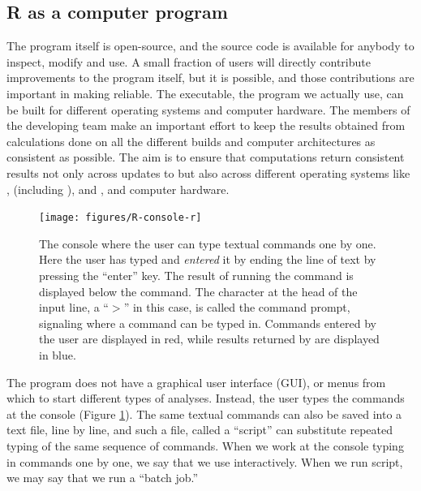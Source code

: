 \documentclass[krantz2]{krantz}\usepackage{knitr}
\begin{document}
\subsection{R as a computer program}
The \Rpgrm program itself is open-source, and the source code is available for anybody to inspect, modify and use. A small fraction of users will directly contribute improvements to the \Rpgrm program itself, but it is possible, and those contributions are important in making \Rpgrm reliable. The executable, the \Rpgrm program we actually use, can be built for different operating systems and computer hardware. The members of the \Rpgrm developing team make an important effort to keep the results obtained from calculations done on all the different builds and computer architectures as consistent as possible. The aim is to ensure that computations return consistent results not only across updates to \Rpgrm but also across different operating systems like ,  (including ), and , and computer hardware.

\begin{figure}
  \centering
  \texttt{[image: figures/R-console-r]}
  \caption[The R console]{The \Rpgrm console where the user can type textual commands one by one. Here the user has typed  and \textit{entered} it by ending the line of text by pressing the ``enter'' key. The result of running the command is displayed below the command. The character at the head of the input line, a ``$>$'' in this case, is called the command prompt, signaling where a command can be typed in. Commands entered by the user are displayed in red, while results returned by \Rlang are displayed in blue.}\label{fig:intro:console}
\end{figure}

The \Rpgrm program does not have a graphical user interface (GUI), or menus from which to start different types of analyses. Instead, the user types the commands at the \Rpgrm console (Figure \ref{fig:intro:console}). The same textual commands can also be saved into a text file, line by line, and such a file, called a ``script'' can substitute repeated typing of the same sequence of commands. When we work at the console typing in commands one by one, we say that we use \Rlang interactively. When we run script, we may say that we run a ``batch job.''
\end{document}
